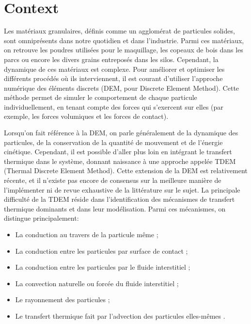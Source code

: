 \documentclass[12pt]{article}
\begin{document}
\pagestyle{fancy}


\section{Context}

Les matériaux granulaires, définis comme un agglomérat de particules solides, sont omniprésents dans notre quotidien et dans l'industrie. Parmi ces matériaux, on retrouve les poudres utilisées pour le maquillage, les copeaux de bois dans les parcs ou encore les divers grains entreposés dans les silos. Cependant, la dynamique de ces matériaux est complexe. Pour améliorer et optimiser les différents procédés où ils interviennent, il est courant d'utiliser l'approche numérique des éléments discrets (DEM, pour Discrete Element Method). Cette méthode permet de simuler le comportement de chaque particule individuellement, en tenant compte des forces qui s'exercent sur elles (par exemple, les forces volumiques et les forces de contact).

Lorsqu'on fait référence à la DEM, on parle généralement de la dynamique des particules, de la conservation de la quantité de mouvement et de l'énergie cinétique. Cependant, il est possible d'aller plus loin en intégrant le transfert thermique dans le système, donnant naissance à une approche appelée TDEM (Thermal Discrete Element Method). Cette extension de la DEM est relativement récente, et il n'existe pas encore de consensus sur la meilleure manière de l'implémenter ni de revue exhaustive de la littérature sur le sujet. La principale difficulté de la TDEM réside dans l'identification des mécanismes de transfert thermique dominants et dans leur modélisation. Parmi ces mécanismes, on distingue principalement:

\begin{itemize}
  \item La conduction au travers de la particule même \cite{komossa_heat_2015,oschmann_development_2016};
  \item La conduction entre les particules par surface de contact \cite{qi_particle_2018,fischer_particle-particle_2023};
  \item La conduction entre les particules par le fluide interstitiel \cite{wang_cfd-dem_2019,peng_heat_2020};
  \item La convection naturelle ou forcée du fluide interstitiel \cite{yang_particle_2015,wang_cfd-dem_2019};
  \item Le rayonnement des particules \cite{wu_numerical_2017,gavino_discrete_2022};
  \item Le transfert thermique fait par l'advection des particules elles-mêmes \cite{wang_mixing_2021}.
\end{itemize}
\end{document}
